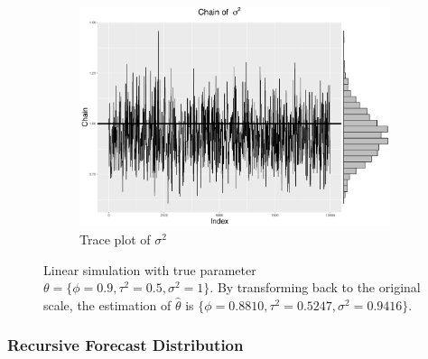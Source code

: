 \begin{figure}[h]
\begin{subfigure}[b]{0.32\textwidth}
    \includegraphics[width=\textwidth]{Chapters/05MCMCOU/plots/linear_sig2.pdf}
     \caption{Trace plot of $\sigma^2$}
\end{subfigure}
\caption{Linear simulation with true parameter $\theta = \{ \phi=0.9,\tau^2=0.5,\sigma^2=1\}$. By transforming back to the original scale, the estimation of $\hat{\theta}$ is $\{\phi = 0.8810, \tau^2 = 0.5247, \sigma^2= 0.9416\}$. }
\label{linearmarginplots}
\end{figure}



\subsubsection*{Recursive Forecast Distribution}\label{sectionlinearRecursive}

